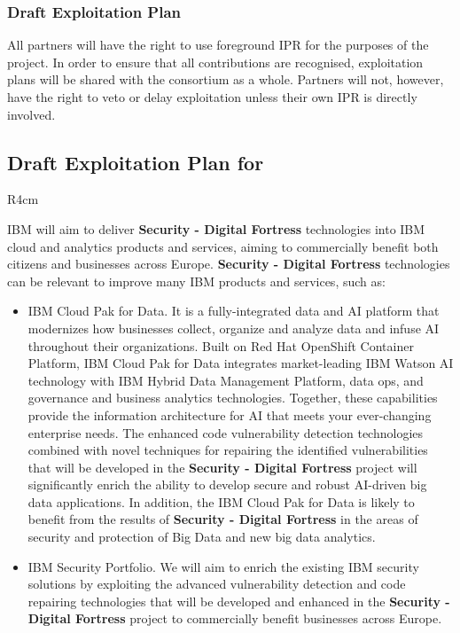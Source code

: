 \documentclass[a4paper,11pt]{article}
\newcommand{\project}[1]{\textbf{#1}\xspace}
\newcommand{\SECURITY}{\project{Security - Digital Fortress}}
\newcommand{\TheProject}{\SECURITY}
\begin{document}
\subsubsection{Draft Exploitation Plan}
\label{sect:exploitation-plan}
\vspace{-12pt}

All partners will have the right to use foreground IPR for
the purposes of the project. In order to ensure that all
contributions are recognised, exploitation plans will be
shared with the consortium as a whole. Partners will not,
however, have the right to veto or delay exploitation
unless their own IPR is directly involved.


\horizontalline

\subsection*{Draft Exploitation Plan for \IBMshort{}}

\begin{wrapfigure}{R}{4cm}
\vspace{-1.4cm}
\hfill {}
\vspace{-0.6cm}
\end{wrapfigure}

IBM will aim to deliver \TheProject technologies into IBM cloud and analytics products and services, aiming to commercially benefit both citizens and businesses across Europe. \TheProject technologies can be relevant to improve many IBM products and services, such as:
\begin{itemize}
    \item IBM Cloud Pak for Data. It is a fully-integrated data and AI platform that modernizes how businesses collect, organize and analyze data and infuse AI throughout their organizations. Built on Red Hat OpenShift Container Platform, IBM Cloud Pak for Data integrates market-leading IBM Watson AI technology with IBM Hybrid Data Management Platform, data ops, and governance and business analytics technologies. Together, these capabilities provide the information architecture for AI that meets your ever-changing enterprise needs. The enhanced code vulnerability detection technologies combined with novel techniques for repairing the identified vulnerabilities that will be developed in the \TheProject project will significantly enrich the ability to develop secure and robust AI-driven big data applications. In addition, the IBM Cloud Pak for Data is likely to benefit from the results of \TheProject in the areas of security and protection of Big Data and new big data analytics.
    \item IBM Security Portfolio. We will aim to enrich the existing IBM security solutions by exploiting the advanced vulnerability detection and code repairing technologies that will be developed and enhanced in the \TheProject project to commercially benefit businesses across Europe.
\end{itemize}
\end{document}
